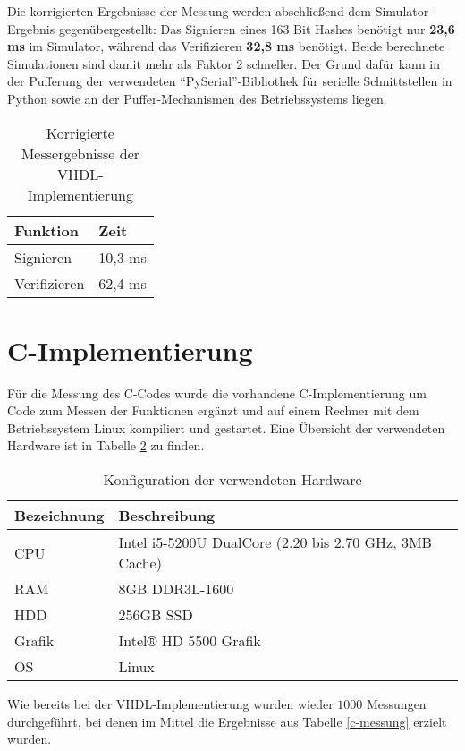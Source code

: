 Die korrigierten Ergebnisse der Messung werden abschließend dem Simulator-Ergebnis gegenübergestellt: Das Signieren eines 163 Bit Hashes benötigt nur \textbf{23,6 ms} im Simulator, während das Verifizieren \textbf{32,8 ms} benötigt. Beide berechnete Simulationen sind damit mehr als Faktor 2 schneller. Der Grund dafür kann in der Pufferung der verwendeten ``PySerial''-Bibliothek für serielle Schnittstellen in Python sowie an der Puffer-Mechanismen des Betriebssystems liegen. \\

\begin{table}[h]
	\centering 
	\begin{tabular}{ | p{3cm} | p{6cm} | }
		\hline
		\textbf{Funktion} & \textbf{Zeit} \\
		\hline
		Signieren & 10,3 ms \\
		\hline
		Verifizieren & 62,4 ms \\
		\hline
	\end{tabular}
	\caption{Korrigierte Messergebnisse der VHDL-Implementierung}
	\label{vhdl-messung-2}
\end{table}

\section{C-Implementierung}
Für die Messung des C-Codes wurde die vorhandene C-Implementierung um Code zum Messen der Funktionen ergänzt und auf einem Rechner mit dem Betriebssystem Linux kompiliert und gestartet. Eine Übersicht der verwendeten Hardware ist in Tabelle \ref{c-impl-hardware} zu finden.

\begin{table}
	\centering 
	\begin{tabular}{ | l | l | }
		\hline
		Bezeichnung & Beschreibung \\
		\hline
		CPU & Intel i5-5200U DualCore (2.20 bis 2.70 GHz, 3MB Cache) \\ 
		RAM & 8GB DDR3L-1600 \\
		HDD & 256GB SSD  \\
		Grafik & Intel® HD 5500 Grafik \\
		OS & Linux \\
		\hline
	\end{tabular}
	\caption{Konfiguration der verwendeten Hardware}
	\label{c-impl-hardware}
\end{table}

Wie bereits bei der VHDL-Implementierung wurden wieder $1000$ Messungen durchgeführt, bei denen im Mittel die Ergebnisse aus Tabelle \ref{c-messung} erzielt wurden.

